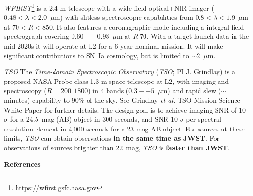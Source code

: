 \documentclass[12pt,preprint]{aastex}
\newcommand{\snia}{SN~Ia\xspace}
\begin{document}
{\it WFIRST}\footnote{\url{https://wfirst.gsfc.nasa.gov}} is a 2.4-m telescope with a wide-field optical+NIR imager ($0.48<\lambda<2.0$~$\mu$m) with slitless spectroscopic capabilities from $0.8<\lambda<1.9$~$\mu$m at $70<R<850$.  It also features a coronagraphic mode including a integral-field spectrograph covering $0.60--0.98$~$\mu$m at $R~70$.  With a target launch data in the mid-2020s it will operate at L2 for a 6-year nominal mission.  It will make significant contributions to \snia cosmology, but is limited to $\sim2$~$\mu$m.

{\it TSO}
The {\it Time-domain Spectroscopic Observatory} ({\it TSO}; PI J. Grindlay) is a proposed NASA Probe-class 1.3-m space telescope at L2, with imaging and spectroscopy ($R=200, 1800$) in 4 bands ($0.3--5$~$\mu$m) and rapid slew ($\sim$minutes) capability to 90\% of the sky.  See Grindlay {\it et al.} TSO Mission Science White Paper for further details.  The design goal is to achieve imaging SNR of 10-$\sigma$ for a 24.5~mag (AB) object in 300 seconds, and SNR 10-$\sigma$ per spectral resolution element in 4,000 seconds for a 23 mag AB object.  For sources at these limits, {\it TSO} can obtain observations {\bf in the same time as JWST}.  For observations of sources brighter than 22~mag, {\it TSO} is {\bf faster than JWST}.



\clearpage
\pagebreak
\textbf{References}

% 


\end{document}
